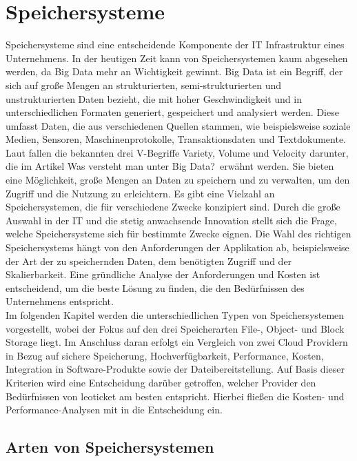 \chapter{Speichersysteme}

Speichersysteme sind eine entscheidende Komponente der IT Infrastruktur eines Unternehmens. In der heutigen Zeit kann von Speichersystemen kaum abgesehen werden, da Big Data mehr an Wichtigkeit gewinnt. Big Data ist ein Begriff, der sich auf große Mengen an strukturierten, semi-strukturierten und unstrukturierten Daten bezieht, die mit hoher Geschwindigkeit und in unterschiedlichen Formaten generiert, gespeichert und analysiert werden. Diese umfasst Daten, die aus verschiedenen Quellen stammen, wie beispielsweise soziale Medien, Sensoren, Maschinenprotokolle, Transaktionsdaten und Textdokumente. Laut \citeauthor{orcl-bigdata} fallen die bekannten drei V-Begriffe Variety, Volume und Velocity darunter, die im Artikel \glqq Was versteht man unter Big Data?\grqq\ erwähnt werden. Sie bieten eine Möglichkeit, große Mengen an Daten zu speichern und zu verwalten, um den Zugriff und die Nutzung zu erleichtern. Es gibt eine Vielzahl an Speichersystemen, die für verschiedene Zwecke konzipiert sind. Durch die große Auswahl in der IT und die stetig anwachsende Innovation stellt sich die Frage, welche Speichersysteme sich für bestimmte Zwecke eignen. Die Wahl des richtigen Speichersystems hängt von den Anforderungen der Applikation ab, beispielsweise der Art der zu speichernden Daten, dem benötigten Zugriff und der Skalierbarkeit. Eine gründliche Analyse der Anforderungen und Kosten ist entscheidend, um die beste Lösung zu finden, die den Bedürfnissen des Unternehmens entspricht.\\

Im folgenden Kapitel werden die unterschiedlichen Typen von Speichersystemen vorgestellt, wobei der Fokus auf den drei Speicherarten File-, Object- und Block Storage liegt. Im Anschluss daran erfolgt ein Vergleich von zwei Cloud Providern in Bezug auf sichere Speicherung, Hochverfügbarkeit, Performance, Kosten, Integration in Software-Produkte sowie der Dateibereitstellung. Auf Basis dieser Kriterien wird eine Entscheidung darüber getroffen, welcher Provider den Bedürfnissen von leoticket am besten entspricht. Hierbei fließen die Kosten- und Performance-Analysen mit in die Entscheidung ein.

\newpage

\section{Arten von Speichersystemen}
 
